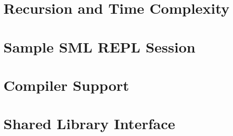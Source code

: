 \documentclass[index=totoc,bibliography=totoc]{scrartcl}
\newcommand{\mylisting}[2][]{%
}
\begin{document}
\clearpage
\begin{appendices}

\makeatletter
{}
\makeatother


\section{Recursion and Time Complexity}

\section{Sample SML REPL Session}

\section{Compiler Support}
\label{app:compiler}


\section{Shared Library Interface}
\label{app:so}

\mylisting[
  caption={[FFI usage example]FFI usage example.},
  firstline=8,fontadjust,language=C,
  label=lst:so]{../src/rstsp/librstsp/test.c}

%

\end{appendices}

\printbibliography%
\end{document}
